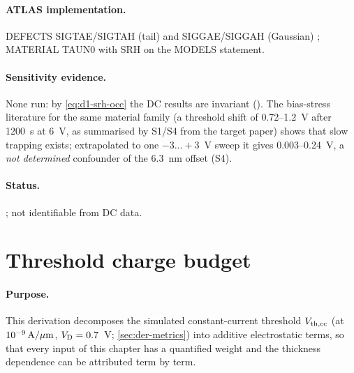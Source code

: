 \paragraph{ATLAS implementation.}
DEFECTS SIGTAE/SIGTAH (tail) and SIGGAE/SIGGAH (Gaussian) \citep[pp.~1168--1169]{AtlasManual}; MATERIAL TAUN0
\citep[p.~1349]{AtlasManual} with SRH on the MODELS statement.

\paragraph{Sensitivity evidence.}
None run: by \cref{eq:d1-srh-occ} the DC results are invariant (\evTHEORY). The bias-stress literature for the same
material family (a threshold shift of 0.72--1.2~V after 1200~s at 6~V, as summarised by S1/S4 from the target paper)
shows that slow trapping exists; extrapolated to one $-3\ldots+3$~V sweep it gives 0.003--0.24~V, a \emph{not
determined} confounder of the 6.3~nm offset (S4).

\paragraph{Status.}
; not identifiable from DC data.

\section{Threshold charge budget}
\label{sec:der-vth-budget}

\paragraph{Purpose.}
This derivation decomposes the simulated constant-current threshold $V_{\mathrm{th,cc}}$ (at $10^{-9}\,\mathrm{A}/\mu\mathrm{m}$, $V_{\mathrm{D}} = 0.7$~V;
\cref{sec:der-metrics}) into additive electrostatic terms, so that every input of this chapter has a quantified weight
and the thickness dependence can be attributed term by term.

